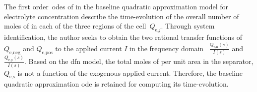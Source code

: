 
The                  first                 order~\glspl{ode}                  of
 in the baseline
quadratic  approximation  model  for   electrolyte  concentration  describe  the
time-evolution of the overall number of moles  of  in each of the three
regions of the cell~$Q_{\text{e,}j}$.  Through system identification, the author
seeks  to  obtain  the  two  rational  transfer  functions  of  $Q_\text{e,neg}$
and  $Q_\text{e,pos}$  to  the  applied  current $I$  in  the  frequency  domain
\ie~$\frac{Q_\text{e,n}(s)}{I(s)}$ and  $\frac{Q_\text{e,p}(s)}{I(s)}$. Based on
the  \gls{dfn}  model,  the total  moles  of    per  unit area  in  the
separator, $Q_\text{e,s}$  is not a  function of the exogenous  applied current.
Therefore,  the  baseline  quadratic  approximation \gls{ode}  is  retained  for
computing its time-evolution.

